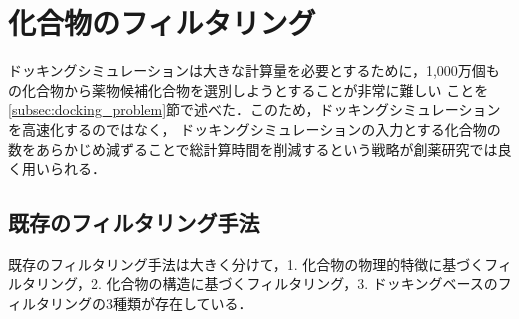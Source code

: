 \section{化合物のフィルタリング}
ドッキングシミュレーションは大きな計算量を必要とするために，1,000万個もの化合物から薬物候補化合物を選別しようとすることが非常に難しい
ことを\ref{subsec:docking_problem}節で述べた．このため，ドッキングシミュレーションを高速化するのではなく，
ドッキングシミュレーションの入力とする化合物の数をあらかじめ減ずることで総計算時間を削減するという戦略が創薬研究では良く用いられる．

\subsection{既存のフィルタリング手法}\label{subsec:existing_filtering}
既存のフィルタリング手法は大きく分けて，1. 化合物の物理的特徴に基づくフィルタリング，2. 化合物の構造に基づくフィルタリング，3. ドッキングベースのフィルタリングの3種類が存在している．
